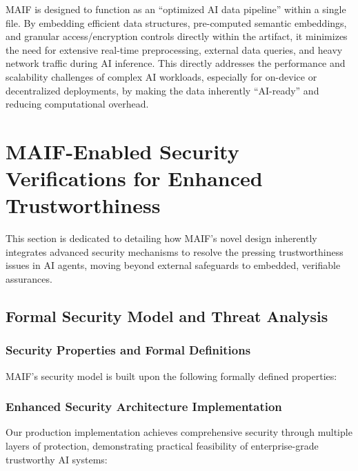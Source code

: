 \documentclass[conference]{IEEEtran}
\begin{document}
MAIF is designed to function as an ``optimized AI data pipeline'' within a single file. By embedding efficient data structures, pre-computed semantic embeddings, and granular access/encryption controls directly within the artifact, it minimizes the need for extensive real-time preprocessing, external data queries, and heavy network traffic during AI inference. This directly addresses the performance and scalability challenges of complex AI workloads, especially for on-device or decentralized deployments, by making the data inherently ``AI-ready'' and reducing computational overhead.

\section{MAIF-Enabled Security Verifications for Enhanced Trustworthiness}
\label{sec:security}

This section is dedicated to detailing how MAIF's novel design inherently integrates advanced security mechanisms to resolve the pressing trustworthiness issues in AI agents, moving beyond external safeguards to embedded, verifiable assurances.

\subsection{Formal Security Model and Threat Analysis}

\subsubsection{Security Properties and Formal Definitions}

MAIF's security model is built upon the following formally defined properties:

\subsubsection{Enhanced Security Architecture Implementation}

Our production implementation achieves comprehensive security through multiple layers of protection, demonstrating practical feasibility of enterprise-grade trustworthy AI systems:
\end{document}
